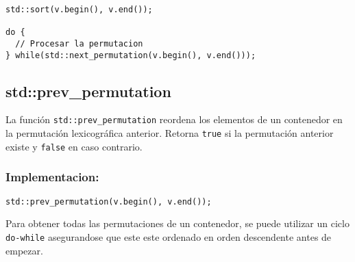 \begin{lstlisting}
std::sort(v.begin(), v.end());

do {
  // Procesar la permutacion
} while(std::next_permutation(v.begin(), v.end()));
\end{lstlisting}

\subsection{std::prev\_permutation}
\label{subsec:std_prev_permutation}
La función \texttt{std::prev\_permutation} reordena los elementos de un contenedor en la permutación lexicográfica anterior. Retorna \texttt{true} si la permutación anterior existe y \texttt{false} en caso contrario. 

\subsubsection*{Implementacion:}
\begin{lstlisting}
std::prev_permutation(v.begin(), v.end());
\end{lstlisting}

Para obtener todas las permutaciones de un contenedor, se puede utilizar un ciclo \texttt{do-while} asegurandose que este este ordenado en orden descendente antes de empezar.
